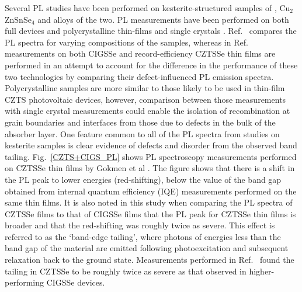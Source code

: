 \documentclass[11pt, twoside]{report}
\begin{document}
Several PL studies have been performed on kesterite-structured samples of {\CZTS}, Cu$_2$ZnSnSe$_4$ and alloys of the two. PL measurements have been performed on both full devices and polycrystalline thin-films \cite{band_tail, Gershon, Gershon_ref18, Romero, Miyamoto, Unold} and single crystals \cite{Halliday, Levcenko, Hones}. Ref.~ compares the PL spectra for varying compositions of the samples, whereas in Ref.~ measurements on both CIGSSe and record-efficiency CZTSSe thin films are performed in an attempt to account for the difference in the performance of these two technologies by comparing their defect-influenced PL emission spectra. Polycrystalline samples are more similar to those likely to be used in thin-film CZTS photovoltaic devices, however, comparison between those measurements with single crystal measurements could enable the isolation of recombination at grain boundaries and interfaces from those due to defects in the bulk of the absorber layer. 
One feature common to all of the PL spectra from studies on kesterite samples is clear evidence of defects and disorder from the observed band tailing. 
Fig.~\ref{CZTS+CIGS_PL} shows PL spectroscopy measurements performed on CZTSSe thin films by Gokmen et al \cite{band_tail}. The figure shows that there is a shift in the PL peak to lower energies (red-shifting), below the value of the band gap obtained from internal quantum efficiency (IQE) measurements performed on the same thin films. It is also noted in this study when comparing the PL spectra of CZTSSe films to that of CIGSSe films that the PL peak for CZTSSe thin films is broader and that the red-shifting was roughly twice as severe. This effect is referred to as the `band-edge tailing', where photons of energies less than the band gap of the material are emitted following photoexcitation and subsequent relaxation back to the ground state. 
Measurements performed in Ref.~ found the tailing in CZTSSe to be roughly twice as severe as that observed in higher-performing CIGSSe devices.
\end{document}
